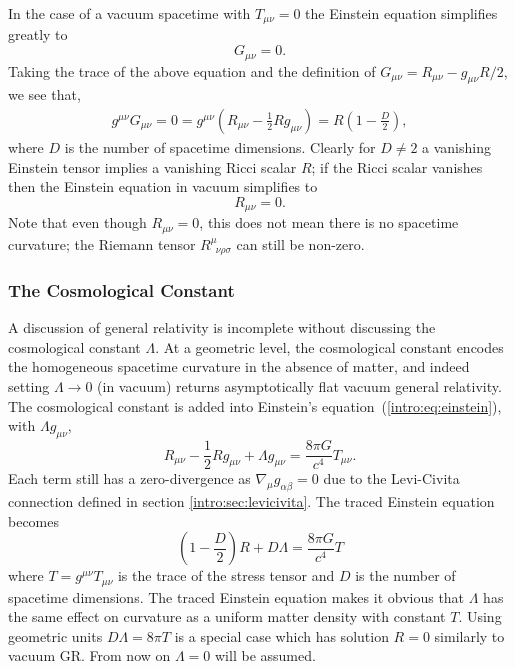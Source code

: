 In the case of a vacuum spacetime with $T_{\mu\nu}=0$ the Einstein equation simplifies greatly to
\begin{equation}G_{\mu\nu}=0.\end{equation}
Taking the trace of the above equation and the definition of $G_{\mu\nu}=R_{\mu\nu}-g_{\mu\nu}R/2$, we see that, 
\begin{align}
g^{\mu\nu}G_{\mu\nu}=0=g^{\mu\nu}\left(R_{\mu\nu}-\frac{1}{2}Rg_{\mu\nu}\right) = R\left(1-\frac{D}{2}\right),
\end{align}
where $D$ is the number of spacetime dimensions. Clearly for $D\neq 2$ a vanishing Einstein tensor implies a vanishing Ricci scalar $R$; if the Ricci scalar vanishes then the Einstein equation in vacuum simplifies to 
\begin{equation}
R_{\mu\nu} = 0.
\end{equation}
Note that even though $R_{\mu\nu}=0$, this does not mean there is no spacetime curvature; the Riemann tensor $R^\mu_{\,\,\,\nu\rho\sigma}$ can still be non-zero.


\subsubsection{The Cosmological Constant} \label{intro:sec:cosmology}
A discussion of general relativity is incomplete without discussing the cosmological constant $\Lambda$. At a geometric level, the cosmological constant encodes the homogeneous spacetime curvature in the absence of matter, and indeed setting $\Lambda\rightarrow 0$ (in vacuum) returns asymptotically flat vacuum general relativity. The cosmological constant is added into Einstein's equation~(\ref{intro:eq:einstein}), with $\Lambda g_{\mu\nu}$,
\begin{equation} \label{intro:eq:einsteinlambda}
R_{\mu\nu}-\frac{1}{2}Rg_{\mu\nu}  +  \Lambda g_{\mu\nu} = \frac{8 \pi G}{c^4}T_{\mu\nu}.
\end{equation}
Each term still has a zero-divergence as $\nabla_\mu g_{\alpha\beta}=0$ due to the Levi-Civita connection defined in section \ref{intro:sec:levicivita}. The traced Einstein equation becomes
\begin{equation}
\left(1- \frac{D}{2}\right)R + D\Lambda = \frac{8\pi G}{c^4}T
\end{equation}
where $T=g^{\mu\nu}T_{\mu\nu}$ is the trace of the stress tensor and $D$ is the number of spacetime dimensions. The traced Einstein equation makes it obvious that $\Lambda$ has the same effect on curvature as a uniform matter density with constant $T$. Using geometric units $D\Lambda = 8\pi T$ is a special case which has solution $R=0$ similarly to vacuum GR. From now on $\Lambda=0$ will be assumed.







